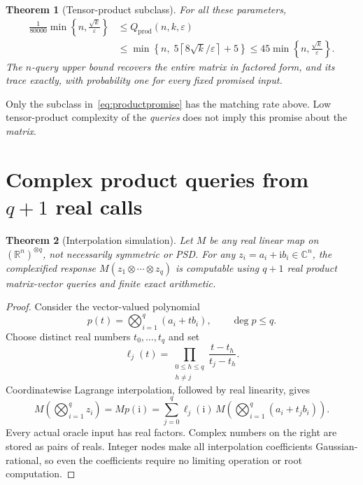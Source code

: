 \documentclass[11pt]{article}
\newtheorem{theorem}{Theorem}[section]
\theoremstyle{definition}\newtheorem{definition}[theorem]{Definition}
\theoremstyle{remark}\newtheorem{remark}[theorem]{Remark}
\newcommand{\R}{\mathbb R}\newcommand{\C}{\mathbb C}
\newcommand{\eps}{\varepsilon}\newcommand{\Qprod}{Q_{\mathrm{prod}}}
\newcommand{\ceil}[1]{\left\lceil#1\right\rceil}
\begin{document}
\begin{theorem}[Tensor-product subclass]\label{thm:productmain}
For all these parameters,
\begin{align}
 \frac1{80000}\min\left\{n,\frac{\sqrt k}{\eps}\right\}
 &\le\Qprod(n,k,\eps)\\
 &\le \min\left\{n,\;5\ceil{8\sqrt k/\eps}+5\right\}
 \le45\min\left\{n,\frac{\sqrt k}{\eps}\right\}.
 \label{eq:productmain}
\end{align}
The $n$-query upper bound recovers the entire matrix in factored form, and its
trace exactly, with probability one for every fixed promised input.
\end{theorem}

Only the subclass in~\eqref{eq:productpromise} has the matching rate above.
Low tensor-product complexity of the \emph{queries} does not imply this promise
about the \emph{matrix}.

\section{Complex product queries from \texorpdfstring{$q+1$}{q+1} real calls}
\label{sec:interpolation}

\begin{theorem}[Interpolation simulation]\label{thm:interpolation}
Let $M$ be any real linear map on $(\R^n)^{\otimes q}$, not necessarily symmetric
or PSD. For any $z_i=a_i+\mathrm{i}b_i\in\C^n$, the complexified response
$M(z_1\otimes\cdots\otimes z_q)$ is computable using $q+1$ real product
matrix-vector queries and finite exact arithmetic.
\end{theorem}
\begin{proof}
Consider the vector-valued polynomial
\[
 p(t)=\bigotimes_{i=1}^q(a_i+t b_i),\qquad \deg p\le q.
\]
Choose distinct real numbers $t_0,\ldots,t_q$ and set
\[
 \ell_j(t)=\prod_{\substack{0\le h\le q\\h\ne j}}
                  \frac{t-t_h}{t_j-t_h}.
\]
Coordinatewise Lagrange interpolation, followed by real linearity, gives
\begin{equation}\label{eq:interpolate}
 M\left(\bigotimes_{i=1}^q z_i\right)
    =M p(\mathrm{i})
    =\sum_{j=0}^q\ell_j(\mathrm{i})\,
             M\left(\bigotimes_{i=1}^q(a_i+t_jb_i)\right).
\end{equation}
Every actual oracle input has real factors. Complex numbers on the right are
stored as pairs of reals. Integer nodes make all interpolation coefficients
Gaussian-rational, so even the coefficients require no limiting operation or
root computation.
\end{proof}
\end{document}
